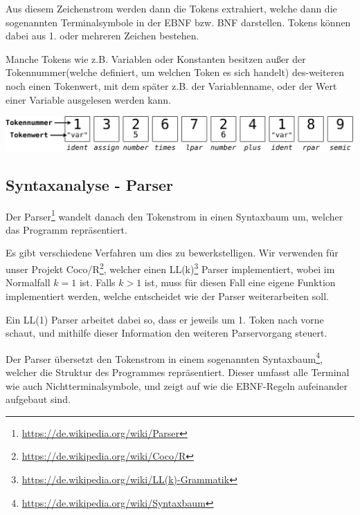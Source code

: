 
Aus diesem Zeichenstrom werden dann die Tokens extrahiert, welche dann die sogenannten Terminalsymbole in der EBNF bzw. BNF darstellen. Tokens k\"onnen dabei aus 1. oder mehreren Zeichen bestehen.

Manche Tokens wie z.B. Variablen oder Konstanten besitzen au\ss{}er der Tokennummer(welche definiert, um welchen Token es sich handelt) des-weiteren noch einen Tokenwert, mit dem sp\"ater z.B. der Variablenname, oder der Wert einer Variable ausgelesen werden kann.

\includegraphics[width=\textwidth]{./media/images/compiler/scanner_tokenstream.png}

\subsection{Syntaxanalyse - Parser}

Der Parser\footnote{\url{https://de.wikipedia.org/wiki/Parser}} wandelt danach den Tokenstrom in einen Syntaxbaum um, welcher das Programm repräsentiert.

Es gibt verschiedene Verfahren um dies zu bewerkstelligen. Wir verwenden f\"ur unser Projekt Coco/R\footnote{\url{https://de.wikipedia.org/wiki/Coco/R}}, welcher einen LL(k)\footnote{\url{https://de.wikipedia.org/wiki/LL(k)-Grammatik}} Parser implementiert, wobei im Normalfall $k = 1$ ist. Falls $k > 1$ ist, muss f\"ur diesen Fall eine eigene Funktion implementiert werden, welche entscheidet wie der Parser weiterarbeiten soll.

Ein LL(1) Parser arbeitet dabei so, dass er jeweils um 1. Token nach vorne schaut, und mithilfe dieser Information den weiteren Parservorgang steuert.


\newpage


Der Parser \"ubersetzt den Tokenstrom in einem sogenannten Syntaxbaum\footnote{\url{https://de.wikipedia.org/wiki/Syntaxbaum}}, welcher die Struktur des Programmes repr\"asentiert. Dieser umfasst alle Terminal wie auch Nichtterminalsymbole, und zeigt auf wie die EBNF-Regeln aufeinander aufgebaut sind.

